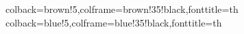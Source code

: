 \usepackage{tcolorbox}

%
{colback=brown!5,colframe=brown!35!black,fonttitle=\bfseries}{th}
%
{colback=blue!5,colframe=blue!35!black,fonttitle=\bfseries}{th}
\usepackage{tikz}
\usepackage{pgfplots}
%
%
%
%
%
%
%
%
%
